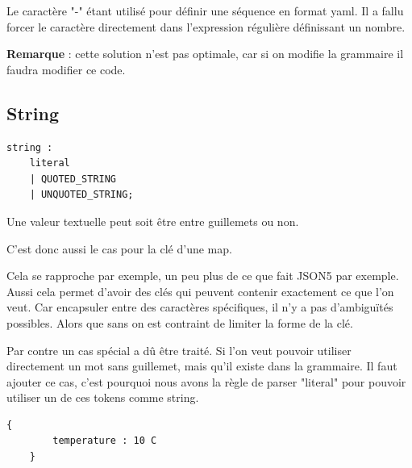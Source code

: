 \documentclass[
    iict, %
    il, %
]{heig-tb}
\begin{document}
Le caractère "-" étant utilisé pour définir une séquence en format yaml.
Il a fallu forcer le caractère directement dans l'expression régulière définissant un nombre.

\textbf{Remarque} : cette solution n'est pas optimale, car si on modifie la grammaire il faudra modifier ce code.

\subsection{String}

\begin{lstlisting}[frame=single,caption={uon-string},label={uon-string}]
    string :
	literal
	| QUOTED_STRING
	| UNQUOTED_STRING;
\end{lstlisting}

Une valeur textuelle peut soit être entre guillemets ou non.

C'est donc aussi le cas pour la clé d'une map.

Cela se rapproche par exemple, un peu plus de ce que fait JSON5 par exemple. %
Aussi cela permet d'avoir des clés qui peuvent contenir exactement ce que l'on veut.
Car encapsuler entre des caractères spécifiques, il n'y a pas d'ambiguïtés possibles. Alors que sans on est contraint de limiter la forme de la clé.

Par contre un cas spécial a dû être traité. Si l'on veut pouvoir utiliser directement un mot sans guillemet, mais qu'il existe dans la grammaire.
Il faut ajouter ce cas, c'est pourquoi nous avons la règle de parser "literal" pour pouvoir utiliser un de ces tokens comme string.

\begin{lstlisting}[frame=single]
    {
        temperature : 10 C
    }
\end{lstlisting}
\end{document}
